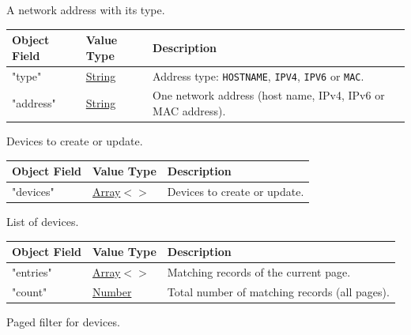 \documentclass[a4paper]{arrowhead}
\newcommand{\mref}[2][]{{\textcolor{ArrowheadPurple}{\hyperref[sec:model:#2]{\ifstrempty{#1}{#2}{#1}}}}}
\newcommand{\pref}[1]{{\textcolor{ArrowheadGrey}{\hyperref[sec:model:primitives:#1]{#1}}}}
\begin{document}

A network address with its type.


\noindent\begin{tabularx}{\textwidth}{| >{\raggedright\arraybackslash}p{3.9cm} | >{\raggedright\arraybackslash\small}p{5.3cm} | X |} \hline
\rowcolor{gray!33} Object Field & Value Type & Description \\ \hline
"type" & \pref{String} & Address type: \texttt{HOSTNAME}, \texttt{IPV4}, \texttt{IPV6} or \texttt{MAC}. \\ \hline
"address" & \pref{String} & One network address (host name, IPv4, IPv6 or MAC address). \\ \hline
\end{tabularx}




Devices to create or update.


\noindent\begin{tabularx}{\textwidth}{| >{\raggedright\arraybackslash}p{3.9cm} | >{\raggedright\arraybackslash\small}p{5.3cm} | X |} \hline
\rowcolor{gray!33} Object Field & Value Type & Description \\ \hline
"devices" & \pref{Array}$<$\allowbreak{}\mref{DeviceRequest}$>$ & Devices to create or update. \\ \hline
\end{tabularx}




List of devices.


\noindent\begin{tabularx}{\textwidth}{| >{\raggedright\arraybackslash}p{3.9cm} | >{\raggedright\arraybackslash\small}p{5.3cm} | X |} \hline
\rowcolor{gray!33} Object Field & Value Type & Description \\ \hline
"entries" & \pref{Array}$<$\allowbreak{}\mref{DeviceResponse}$>$ & Matching records of the current page. \\ \hline
"count" & \pref{Number} & Total number of matching records (all pages). \\ \hline
\end{tabularx}




Paged filter for devices.
\end{document}
